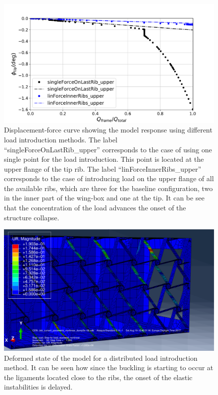     \begin{figure}[!htpb]
      \centering
      \includegraphics[width=0.8 \textwidth]{figures/result-model/forceDisplacement-distributedLoad700N}
      \caption[Displacement-force curve showing the model response using different load introduction methods]{Displacement-force curve showing the model response using different load introduction methods. The label ``singleForceOnLastRib\_upper'' corresponds to the case of using one single point for the load introduction. This point is located at the upper flange of the tip rib. The label ``linForceInnerRibs\_upper'' corresponds to the case of introducing load on the upper flange of all the available ribs, which are three for the baseline configuration, two in the inner part of the wing-box and one at the tip. It can be see that the concentration of the load advances the onset of the structure collapse.}
      \label{fig:forceDisplacement-distributedLoad700N}
    \end{figure}

    \begin{figure}[!htpb]
      \centering
      \includegraphics[width=0.8 \textwidth]{figures/result-model/distributedLoad700N}
      \caption[Deformed state of the model for a distributed load introduction method]{Deformed state of the model for a distributed load introduction method. It can be seen how since the buckling is starting to occur at the ligaments located close to the ribs, the onset of the elastic instabilities is delayed.}
      \label{fig:distributedLoad700N}
    \end{figure}

